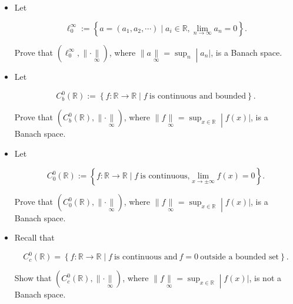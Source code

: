 \documentclass{qlnotes-export}
\begin{document}
\begin{itemize}
\item
  Let

  \[\ell_{0}^{\infty} := \left\{ {a = (a_{1},a_{2},\cdots) \mid a_{i} \in {\mathbb{R}},\lim\limits_{n\rightarrow\infty}a_{n} = 0} \right\}.\]

  Prove that \((\ell_{0}^{\infty}, \parallel \cdot \underset{\infty}{\parallel})\), where \(\left. \parallel a\underset{\infty}{\parallel} = \sup_{n} \middle| a_{n}| \right.\), is a Banach space.
\item
  Let

  \[C_{b}^{0}({\mathbb{R}}) := \left\{ {f:{\mathbb{R}}\rightarrow{\mathbb{R}} \mid f\ \text{is continuous and bounded}} \right\}.\]

  Prove that \((C_{b}^{0}({\mathbb{R}}), \parallel \cdot \underset{\infty}{\parallel})\), where \(\left. \parallel f\underset{\infty}{\parallel} = \sup_{x \in {\mathbb{R}}} \middle| f(x)| \right.\), is a Banach space.
\item
  Let

  \[C_{0}^{0}({\mathbb{R}}) := \left\{ {f:{\mathbb{R}}\rightarrow{\mathbb{R}} \mid f\ \text{is continuous,}\lim\limits_{x\rightarrow \pm \infty}f(x) = 0} \right\}.\]

  Prove that \((C_{0}^{0}({\mathbb{R}}), \parallel \cdot \underset{\infty}{\parallel})\), where \(\left. \parallel f\underset{\infty}{\parallel} = \sup_{x \in {\mathbb{R}}} \middle| f(x)| \right.\), is a Banach space.
\item
  Recall that

  \[C_{c}^{0}({\mathbb{R}}) = \left\{ {f:{\mathbb{R}}\rightarrow{\mathbb{R}} \mid f\ \text{is continuous and}\ f = 0\ \text{outside a bounded set}} \right\}.\]

  Show that \((C_{c}^{0}({\mathbb{R}}), \parallel \cdot \underset{\infty}{\parallel})\), where \(\left. \parallel f\underset{\infty}{\parallel} = \sup_{x \in {\mathbb{R}}} \middle| f(x)| \right.\), is not a Banach space.
\end{itemize}
\end{document}
